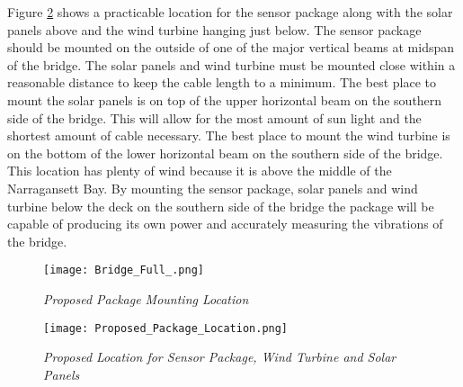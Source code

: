 Figure \ref{fig:Proposed Package, Panels and Turbine Location} shows a practicable location for the sensor package along with the solar panels above and
the wind turbine hanging just below. The sensor package should be mounted on the outside of one of the major vertical beams at midspan of the bridge. The
solar panels and wind turbine must be mounted close within a reasonable distance to keep the cable length to a minimum. The best place to mount the
solar panels is on top of the upper horizontal beam on the southern side of the bridge. This will allow for the most amount of sun light and the
shortest amount of cable necessary. The best place to mount the wind turbine is on the bottom of the lower horizontal beam on the southern side of the
bridge. This location has plenty of wind because it is above the middle of the Narragansett Bay. By mounting the sensor package, solar panels and
wind turbine below the deck on the southern side of the bridge the package will be capable of producing its own power and accurately measuring the
vibrations of the bridge.


\begin{figure}[ht]
\centering
\texttt{[image: Bridge\_Full\_.png]}
\caption{\textit{Proposed Package Mounting Location}}
\label{fig:PackageLocation}
\end{figure}


\begin{figure}[ht]
\centering
\texttt{[image: Proposed\_Package\_Location.png]}
\caption{\textit{Proposed Location for Sensor Package, Wind Turbine and Solar Panels}}
\label{fig:Proposed Package, Panels and Turbine Location}
\end{figure}

